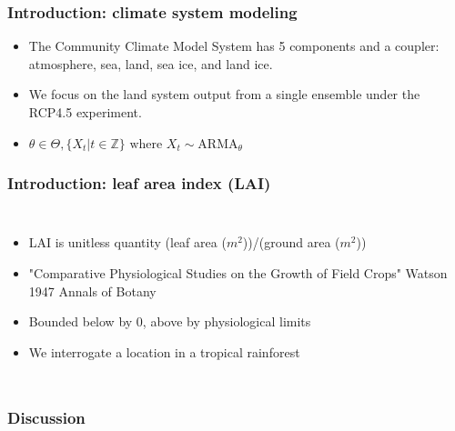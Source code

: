 \documentclass{beamer}
\begin{document}
\begin{frame}
    \frametitle{Introduction: climate system modeling}
    \begin{itemize}
        \item The Community Climate Model System has 5 components and a coupler:
            atmosphere, sea, land, sea ice, and land ice.
        \item We focus on the land system output from a single ensemble under
            the RCP4.5 experiment.

        \item $\theta\in\Theta, \{X_t|t\in\mathbb{Z}\} \textrm{ where }
            X_t\sim \textrm{ARMA}_\theta$
    \end{itemize}
\end{frame}

\begin{frame}
    \frametitle{Introduction: leaf area index (LAI)}
    \begin{columns}

        \column{2in}
            \begin{itemize}
                \item LAI is unitless quantity (leaf area ($m^2$))/(ground area ($m^2$))
                \item "Comparative Physiological Studies on the Growth of Field Crops" Watson 1947 Annals of Botany
                \item Bounded below by 0, above by physiological limits
                \item We interrogate a location in a tropical rainforest
            \end{itemize}

        \column{3in}

    \end{columns}
\end{frame}


\begin{frame}
    \frametitle{Discussion}
\end{frame}
\end{document}
